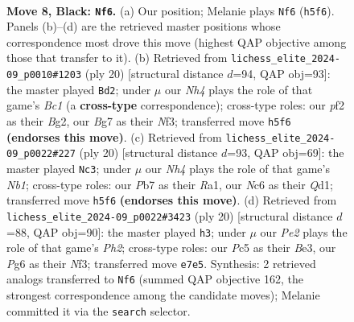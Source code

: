 \documentclass[11pt]{article}
\begin{document}
\begin{figure}[p]\centering
\begin{subfigure}{0.46\textwidth}\centering
\resizebox{\linewidth}{!}{%
\newchessgame
\chessboard[
  setfen={r1bq1rk1/pp1pppbp/2n3p1/2p4n/Q1P5/P1N2NP1/1P1PPPBP/R1B2RK1 b - - 2 8},
  showmover=false,
  pgfstyle=straightmove, color=movearrow, markmove={h5-f6}
]}
\caption{}
\end{subfigure}\hfill
\begin{subfigure}{0.46\textwidth}\centering
\resizebox{\linewidth}{!}{%
\newchessgame
\chessboard[
  setfen={r1bq1rk1/pp2p1bp/2np1np1/5p2/Q1P5/2N2NP1/PP2PPBP/R1B2RK1 w - - 0 11},
  showmover=false,
  pgfstyle=straightmove, color=movearrow, markmove={c1-d2}
]}
\caption{}
\end{subfigure}
\\[4pt]
\begin{subfigure}{0.46\textwidth}\centering
\resizebox{\linewidth}{!}{%
\newchessgame
\chessboard[
  setfen={r1b2rk1/pp2bppp/1qn1pn2/3p4/P4P2/1P2PNP1/1B1P2BP/RN1Q1RK1 w - - 3 11},
  showmover=false,
  pgfstyle=straightmove, color=movearrow, markmove={b1-c3}
]}
\caption{}
\end{subfigure}\hfill
\begin{subfigure}{0.46\textwidth}\centering
\resizebox{\linewidth}{!}{%
\newchessgame
\chessboard[
  setfen={r1b2rk1/pp2ppbp/2np1np1/q7/2P1P3/2N1BN2/PP2BPPP/R2Q1RK1 w - - 2 11},
  showmover=false,
  pgfstyle=straightmove, color=movearrow, markmove={h2-h3}
]}
\caption{}
\end{subfigure}
\caption{\textbf{Move 8, Black: \texttt{Nf6}.} (a) Our position; Melanie plays \texttt{Nf6} (\texttt{h5f6}). Panels (b)--(d) are the retrieved master positions whose correspondence most drove this move (highest QAP objective among those that transfer to it). (b) Retrieved from \texttt{lichess\_elite\_2024-09\_p0010\#1203} (ply 20) [structural distance $d$=94, QAP obj=93]: the master played \texttt{Bd2}; under $\mu$ our \emph{Nh4} plays the role of that game's \emph{Bc1} (a \textbf{cross-type} correspondence); cross-type roles: our \emph{p}f2 as their \emph{B}g2, our \emph{B}g7 as their \emph{N}f3; transferred move \texttt{h5f6} \textbf{(endorses this move)}. (c) Retrieved from \texttt{lichess\_elite\_2024-09\_p0022\#227} (ply 20) [structural distance $d$=93, QAP obj=69]: the master played \texttt{Nc3}; under $\mu$ our \emph{Nh4} plays the role of that game's \emph{Nb1}; cross-type roles: our \emph{P}b7 as their \emph{R}a1, our \emph{N}c6 as their \emph{Q}d1; transferred move \texttt{h5f6} \textbf{(endorses this move)}. (d) Retrieved from \texttt{lichess\_elite\_2024-09\_p0022\#3423} (ply 20) [structural distance $d$=88, QAP obj=90]: the master played \texttt{h3}; under $\mu$ our \emph{Pe2} plays the role of that game's \emph{Ph2}; cross-type roles: our \emph{P}c5 as their \emph{B}e3, our \emph{P}g6 as their \emph{N}f3; transferred move \texttt{e7e5}. Synthesis: 2 retrieved analogs transferred to \texttt{Nf6} (summed QAP objective 162, the strongest correspondence among the candidate moves); Melanie committed it via the \texttt{search} selector.}
\label{fig:thought-m15}
\end{figure}
\end{document}
